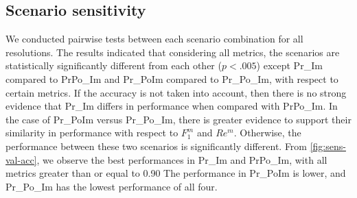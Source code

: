 \documentclass[Journal,letterpaper, SingleSpace, InsideFigs]{ascelike-new}
\begin{document}

\subsection{Scenario sensitivity}
We conducted pairwise tests between each scenario combination for all resolutions.
The results indicated that considering all metrics, the scenarios are statistically significantly different from each other ($p < .005$) except Pr\_Im compared to PrPo\_Im and Pr\_PoIm compared to Pr\_Po\_Im, with respect to certain metrics.
If the accuracy is not taken into account, then there is no strong evidence that Pr\_Im differs in performance when compared with PrPo\_Im.
In the case of Pr\_PoIm versus Pr\_Po\_Im, there is greater evidence to support their similarity in performance 
with respect to  $F_{1}^{m}$ and $Re^{m}$. %
Otherwise, the performance between these two scenarios is significantly different.
From \autoref{fig:sens-val-acc}, we observe the best performances in Pr\_Im and PrPo\_Im, with all metrics greater than or equal to 0.90
The performance in Pr\_PoIm is lower, and Pr\_Po\_Im has the lowest performance of all four.
\end{document}
